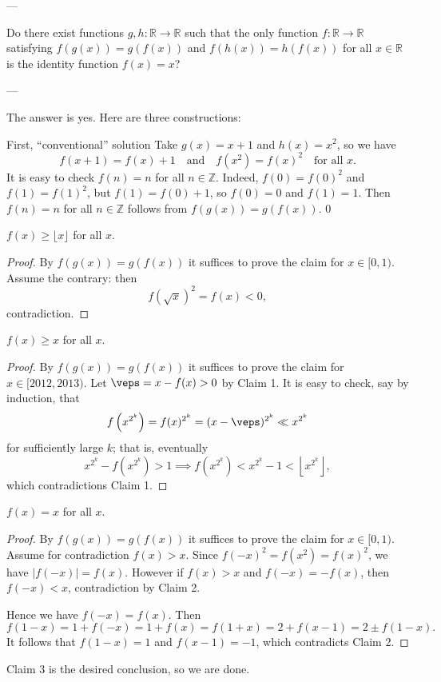 
---

Do there exist functions $g,h:\mathbb R\to\mathbb R$ such that the only function $f:\mathbb R\to\mathbb R$ satisfying $f(g(x))=g(f(x))$ and $f(h(x))=h(f(x))$ for all $x\in\mathbb R$ is the identity function $f(x)=x$?

---

The answer is yes. Here are three constructions:
\begin{customenv}{First, ``conventional'' solution}
    Take $g(x)=x+1$ and $h(x)=x^2$, so we have \[f(x+1)=f(x)+1\quad\text{and}\quad f\left(x^2\right)=f(x)^2\quad\text{for all }x.\]
    It is easy to check $f(n)=n$ for all $n\in\mathbb Z$. Indeed, $f(0)=f(0)^2$ and $f(1)=f(1)^2$, but $f(1)=f(0)+1$, so $f(0)=0$ and $f(1)=1$. Then $f(n)=n$ for all $n\in\mathbb Z$ follows from $f(g(x))=g(f(x))$.
    \setcounter{iclaim}0
    \begin{iclaim}
        $f(x)\ge\lfloor x\rfloor$ for all $x$.
    \end{iclaim}
    \begin{proof}
        By $f(g(x))=g(f(x))$ it suffices to prove the claim for $x\in[0,1)$. Assume the contrary: then \[f\left(\sqrt x\right)^2=f(x)<0,\]
        contradiction.
    \end{proof}
    \begin{iclaim}
        $f(x)\ge x$ for all $x$.
    \end{iclaim}
    \begin{proof}
        By $f(g(x))=g(f(x))$ it suffices to prove the claim for $x\in[2012,2013)$. Let $\veps=x-f(x)>0$ by Claim 1. It is easy to check, say by induction, that \[f\left(x^{2^k}\right)=f(x)^{2^k}=(x-\veps)^{2^k}\ll x^{2^k}\]
        for sufficiently large $k$; that is, eventually \[x^{2^k}-f\left(x^{2^k}\right)>1\implies f\left(x^{2^k}\right)<x^{2^k}-1<\left\lfloor x^{2^k}\right\rfloor,\]
        which contradictions Claim 1.
    \end{proof}
    \begin{iclaim}
        $f (x)=x$ for all $x$.
    \end{iclaim}
    \begin{proof}
        By $f(g(x))=g(f(x))$ it suffices to prove the claim for $x\in[0,1)$. Assume for contradiction $f(x)>x$. Since $f(-x)^2=f(x^2)=f(x)^2$, we have $|f(-x)|=f(x)$. However if $f(x)>x$ and $f(-x)=-f(x)$, then $f(-x)<x$, contradiction by Claim 2.

        Hence we have $f(-x)=f(x)$. Then \[f(1-x)=1+f(-x)=1+f(x)=f(1+x)=2+f(x-1)=2\pm f(1-x).\]
        It follows that $f(1-x)=1$ and $f(x-1)=-1$, which contradicts Claim 2.
    \end{proof}

    Claim 3 is the desired conclusion, so we are done.
\end{customenv}
